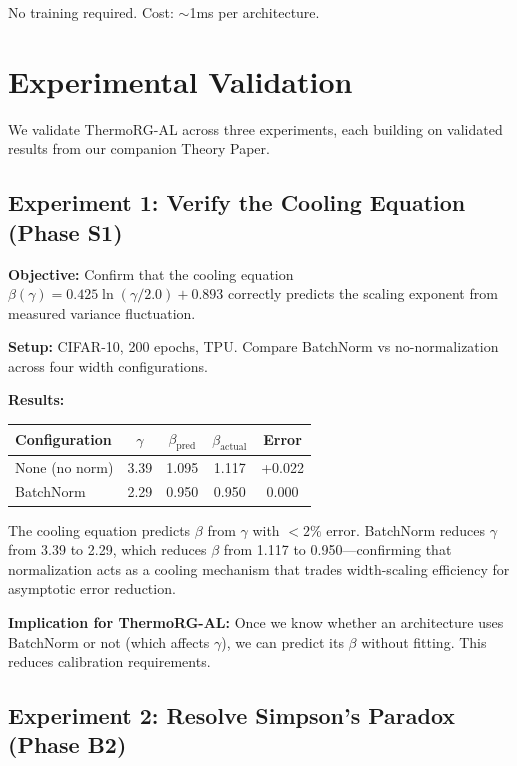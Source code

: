 \documentclass[11pt, a4paper]{article}
\theoremstyle{plain}
\begin{document}
No training required. Cost: $\sim$1ms per architecture.

\section{Experimental Validation}

We validate ThermoRG-AL across three experiments, each building on validated results from our companion Theory Paper.

\subsection{Experiment 1: Verify the Cooling Equation (Phase S1)}

\textbf{Objective:} Confirm that the cooling equation $\beta(\gamma) = 0.425\ln(\gamma/2.0) + 0.893$ correctly predicts the scaling exponent from measured variance fluctuation.

\textbf{Setup:} CIFAR-10, 200 epochs, TPU. Compare BatchNorm vs no-normalization across four width configurations.

\textbf{Results:}

\begin{center}
\begin{tabular}{lcccc}
\toprule
Configuration & $\gamma$ & $\beta_{\mathrm{pred}}$ & $\beta_{\mathrm{actual}}$ & Error \\
\midrule
None (no norm) & 3.39 & 1.095 & 1.117 & +0.022 \\
BatchNorm & 2.29 & 0.950 & 0.950 & 0.000 \\
\bottomrule
\end{tabular}
\end{center}

The cooling equation predicts $\beta$ from $\gamma$ with $<2\%$ error. BatchNorm reduces $\gamma$ from 3.39 to 2.29, which reduces $\beta$ from 1.117 to 0.950---confirming that normalization acts as a cooling mechanism that trades width-scaling efficiency for asymptotic error reduction.

\textbf{Implication for ThermoRG-AL:} Once we know whether an architecture uses BatchNorm or not (which affects $\gamma$), we can predict its $\beta$ without fitting. This reduces calibration requirements.

\subsection{Experiment 2: Resolve Simpson's Paradox (Phase B2)}
\end{document}
